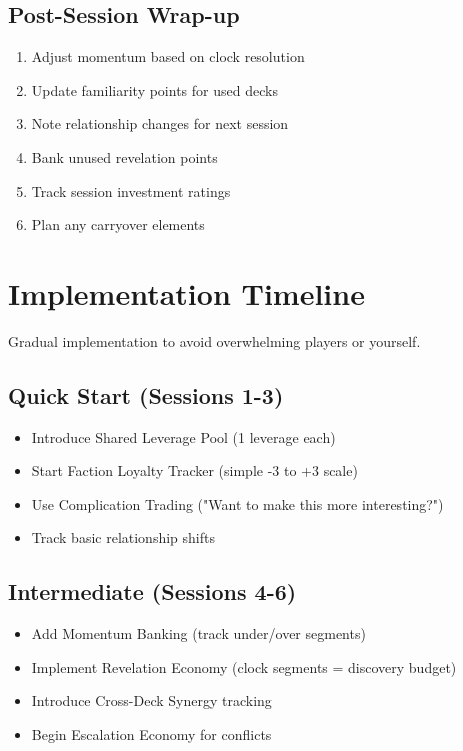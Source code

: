 \begin{description}
\subsection{Post-Session Wrap-up}

\begin{enumerate}
\item Adjust momentum based on clock resolution
\item Update familiarity points for used decks
\item Note relationship changes for next session
\item Bank unused revelation points
\item Track session investment ratings
\item Plan any carryover elements
\end{enumerate}

\section{Implementation Timeline}

Gradual implementation to avoid overwhelming players or yourself.

\subsection{Quick Start (Sessions 1-3)}

\begin{itemize}
\item Introduce Shared Leverage Pool (1 leverage each)
\item Start Faction Loyalty Tracker (simple -3 to +3 scale)
\item Use Complication Trading ("Want to make this more interesting?")
\item Track basic relationship shifts
\end{itemize}

\subsection{Intermediate (Sessions 4-6)}

\begin{itemize}
\item Add Momentum Banking (track under/over segments)
\item Implement Revelation Economy (clock segments = discovery budget)
\item Introduce Cross-Deck Synergy tracking
\item Begin Escalation Economy for conflicts
\end{itemize}


\end{description}
